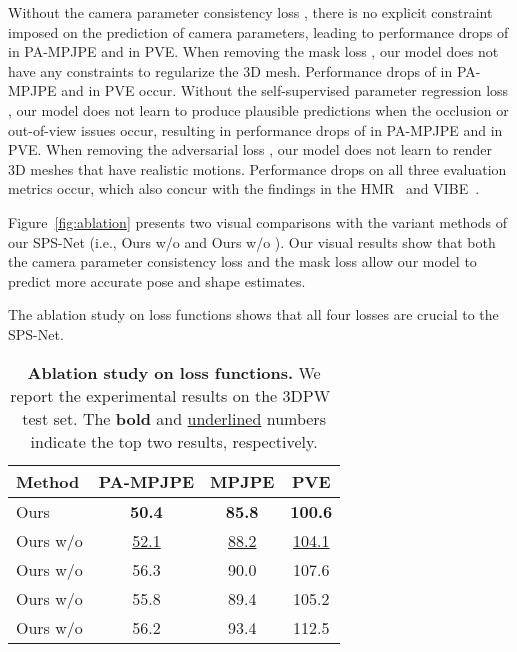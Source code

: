 \documentclass[times,referee,twocolumn,final,authoryear]{elsarticle}
\newcommand{\first}[1]{{\color{blue}\textbf{#1}}}
\newcommand{\second}[1]{{\color{red}\underline{#1}}}
\begin{document}
Without the camera parameter consistency loss , there is no explicit constraint imposed on the prediction of camera parameters, leading to performance drops of  in PA-MPJPE and  in PVE.
When removing the mask loss , our model does not have any constraints to regularize the 3D mesh.
Performance drops of  in PA-MPJPE and  in PVE occur.
Without the self-supervised parameter regression loss , our model does not learn to produce plausible predictions when the occlusion or out-of-view issues occur, resulting in performance drops of  in PA-MPJPE and  in PVE.
When removing the adversarial loss , our model does not learn to render 3D meshes that have realistic motions.
Performance drops on all three evaluation metrics occur, which also concur with the findings in the HMR~\citep{HMR} and VIBE~\citep{VIBE}.

Figure~\ref{fig:ablation} presents two visual comparisons with the variant methods of our SPS-Net (i.e., Ours w/o  and Ours w/o ).
Our visual results show that both the camera parameter consistency loss  and the mask loss  allow our model to predict more accurate pose and shape estimates.

The ablation study on loss functions shows that all four losses are crucial to the SPS-Net.

\begin{table}[t]
  \caption{
\textbf{Ablation study on loss functions.}
We report the experimental results on the 3DPW~\citep{3DPW} test set.
The \first{bold} and \second{underlined} numbers indicate the top two results, respectively.
  }
  \vspace{-6.0mm}
  \begin{center}
    \scriptsize
    \label{exp:ablation-loss}
{
    \begin{tabular}{lccc}
\toprule
Method & PA-MPJPE  & MPJPE  & PVE  \\
\midrule
Ours & \first{50.4} & \first{85.8} & \first{100.6} \\
Ours w/o  & \second{52.1} & \second{88.2} & \second{104.1} \\
Ours w/o  & 56.3 & 90.0 & 107.6 \\
Ours w/o  & 55.8 & 89.4 & 105.2 \\
Ours w/o  & 56.2 & 93.4 & 112.5 \\
\bottomrule
\end{tabular}
    }
  \end{center}
  \vspace{-10.0mm}
\end{table}
\end{document}
